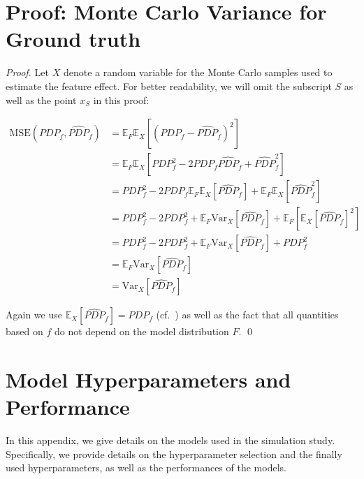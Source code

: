 \documentclass[runningheads]{llncs}
\begin{document}
\section{Proof: Monte Carlo Variance for Ground truth}\label{app:proof-mc-variance}
\begin{proof}
    Let $X$ denote a random variable for the Monte Carlo samples used to estimate the feature effect.
    For better readability, we will omit the subscript $S$ as well as the point $x_S$ in this proof:

    \begin{align*}
        \text{MSE}(PDP_{f}, \widehat{PDP}_{f}) & = \mathbb{E}_F\mathbb{E}_X[{(PDP_f - \widehat{PDP}_f)}^2]                                                          \\
                                               & = \mathbb{E}_F\mathbb{E}_X[PDP_f^2 - 2PDP_f \widehat{PDP}_f + \widehat{PDP}_f^2]                                   \\
                                               & = PDP_f^2 - 2PDP_f \mathbb{E}_F\mathbb{E}_X[\widehat{PDP}_f] + \mathbb{E}_F\mathbb{E}_X[\widehat{PDP}_f^2]         \\
                                               & = PDP_f^2 - 2PDP_f^2 + \mathbb{E}_F\text{Var}_X[\widehat{PDP}_f] + \mathbb{E}_F[\mathbb{E}_X{[\widehat{PDP}_f]}^2] \\
                                               & = PDP_f^2 - 2PDP_f^2 + \mathbb{E}_F\text{Var}_X[\widehat{PDP}_f] + PDP_f^2                                         \\
                                               & = \mathbb{E}_F\text{Var}_X[\widehat{PDP}_f]                                                                        \\
                                               & = \text{Var}_X[\widehat{PDP}_f]
    \end{align*}

    \noindent Again we use $\mathbb{E}_X[\widehat{PDP}_{f}] = PDP_{f}$ (cf.~\cite{molnar_relating_2023}) as well as the fact
    that all quantities based on $f$ do not depend on the model distribution $F$.
    \qed\
\end{proof}

\section{Model Hyperparameters and Performance}\label{app:model-hps-perf}
In this appendix, we give details on the models used in the simulation study.
Specifically, we provide details on the hyperparameter selection and the
finally used hyperparameters, as well as the performances of the models.
\end{document}

